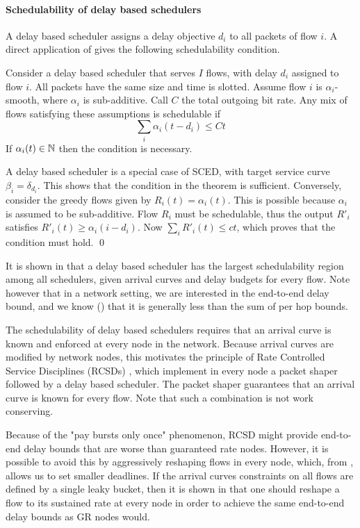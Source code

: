 \paragraph{Schedulability of delay based schedulers}

A delay based scheduler assigns a delay objective $d_i$ to all
packets of flow $i$. A direct application of
 gives the following schedulability
condition.
\begin{theorem}
Consider a delay based scheduler that serves $I$ flows, with delay
$d_i$ assigned to flow $i$. All packets have the same size and
time is slotted. Assume flow $i$ is $\alpha_i$-smooth, where
$\alpha_i$ is sub-additive. Call $C$ the total outgoing bit rate.
Any mix of flows satisfying these assumptions is schedulable if
$$
\sum_i \alpha_i(t - d_i) \leq Ct
$$
If $\alpha_i(t) \in \mathbb{N}$ then the condition is necessary.
\end{theorem}
\pr
A delay based scheduler is a special case of SCED, with target
service curve $\beta_i=\delta_{d_i}$. This shows that the
condition in the theorem is sufficient. Conversely, consider the
greedy flows given by $R_i(t)=\alpha_i(t)$. This is possible
because $\alpha_i$ is assumed to be sub-additive. Flow $R_i$ must
be schedulable, thus the output $R'_i$ satisfies $R'_i(t) \geq
\alpha_i(i- d_i)$. Now $\sum_i R'_i(t) \leq ct$, which proves that
the condition must hold. \qed

It is shown in \cite{LWF96} that a delay based scheduler has the
largest schedulability region among all schedulers, given arrival
curves and delay budgets for every flow. Note however that in a
network setting, we are interested in the end-to-end delay bound,
and we know () that it is generally less than the
sum of per hop bounds.

The schedulability of delay based schedulers requires that an
arrival curve is known and enforced at every node in the network.
Because arrival curves are modified by network nodes, this
motivates the principle of Rate Controlled Service Disciplines
(RCSDs) \cite{chuck90,zf94,gue96}, which implement in every node a
packet shaper followed by a delay based scheduler. The packet
shaper guarantees that an arrival curve is known for every flow.
Note that such a combination is not work conserving.

Because of the "pay bursts only once" phenomenon, RCSD might
provide end-to-end delay bounds that are worse than guaranteed
rate nodes. However, it is possible to avoid this by aggressively
reshaping flows in every node, which, from ,
allows us to set smaller deadlines. If the arrival curves
constraints on all flows are defined by a single leaky bucket,
then it is shown in \cite{boyer,peris97} that one should reshape a
flow to its sustained rate at every node in order to achieve the
same end-to-end delay bounds as GR nodes would.


